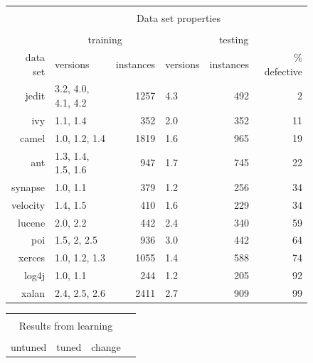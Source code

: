 \documentclass[conference]{IEEEtran}
\begin{document}
\begin{figure}[!t]
\scriptsize
   \begin{center}
   \begin{minipage}{.46\linewidth}
    \begin{tabular}{r@{~}|l@{~}|r@{~}|l@{~}|r@{~}|r@{~}|} \cline{2-6}
   & \multicolumn{5}{c|}{ }\\ 
   
   & \multicolumn{5}{c|}{ Data set  properties}\\ 
   & \multicolumn{5}{c|}{  }\\ 
           & \multicolumn{2}{c|}{training}   & \multicolumn{3}{c|}{testing}      \\ \cline{2-6}
   data set      & versions           & instances & versions     & instances    & \% defective             \\ \hline
        jedit    & 3.2, 4.0, 4.1, 4.2 & 1257      & 4.3          & 492          & 2 \\
        ivy      & 1.1, 1.4           & 352       & 2.0          & 352          & 11 \\
        camel    & 1.0, 1.2, 1.4      & 1819      & 1.6          & 965          & 19 \\
        ant      & 1.3, 1.4, 1.5, 1.6 & 947       & 1.7          & 745          & 22 \\
        synapse  & 1.0, 1.1           & 379       & 1.2          & 256          & 34 \\
        velocity & 1.4, 1.5           & 410       & 1.6          & 229          & 34 \\
        lucene   & 2.0, 2.2           & 442       & 2.4          & 340          & 59 \\
        poi      & 1.5, 2, 2.5        & 936       & 3.0          & 442          & 64 \\
        xerces   & 1.0, 1.2, 1.3      & 1055      & 1.4          & 588          & 74  \\ 
        log4j    & 1.0, 1.1           & 244       & 1.2          & 205          & 92   \\
        xalan    & 2.4, 2.5, 2.6      & 2411      & 2.7          & 909          & 99  \\\hline 
        
        
    \end{tabular}\end{minipage}\begin{minipage}{.4\linewidth}
    \begin{tabular}{|rrr|rrr|rr|l} \cline{1-8}
      \multicolumn{8}{|c|}{  }\\
      \multicolumn{8}{|c|}{  Results from learning}\\
       \multicolumn{8}{|c|}{   }\\
   \multicolumn{3}{|c|}{untuned} & \multicolumn{3}{c|}{tuned} & \multicolumn{2}{c|}{change}\\
  \cline{1-8}
  

\end{tabular}
\end{minipage}
\end{center}
\end{figure}
\end{document}
